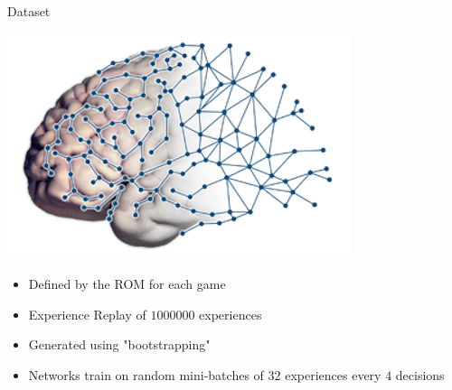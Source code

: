 \documentclass{beamer}
\begin{document}
\begin{frame}{Dataset}
\begin{minipage}{\textwidth}
%
\begin{minipage}{0.35\textwidth}
\centering
\includegraphics[width=\textwidth]{img/brain}
\end{minipage}
%
\hfill
%
\begin{minipage}{0.6\textwidth}
\begin{itemize}
    \item{Defined by the ROM for each game}
    \item{Experience Replay of $1000000$ experiences}
    \item{Generated using "bootstrapping"}
    \item{Networks train on random mini-batches of $32$ experiences every $4$ decisions}
\end{itemize}
\end{minipage}
%
\end{minipage}
\end{frame}
\end{document}
